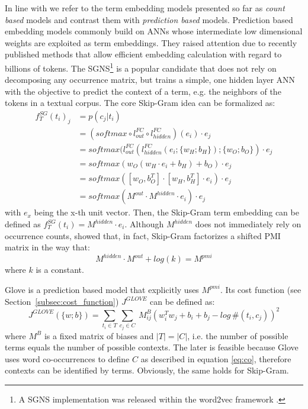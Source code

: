 In line with \textcite{levy_improving_2015} we refer to the term embedding models presented so far as \textit{count based} models and contrast them with \textit{prediction based} models. Prediction based embedding models commonly build on \ac{ANN}s whose intermediate low %
dimensional weights are exploited as term embeddings. They raised attention due to recently published methods that allow efficient embedding calculation with regard to billions of tokens. The \ac{SGNS}\footnote{A \ac{SGNS} implementation was released within the word2vec framework \autocite{mikolov_efficient_2013}.} \autocite{mikolov_distributed_2013} is a popular candidate that does not rely on decomposing any occurrence matrix, but trains a simple, one hidden layer \acs{ANN} with the objective to predict the context of a term, e.g. the neighbors of the tokens in a textual corpus. The core Skip-Gram idea can be formalized as:
\begin{equation} \label{eq:sg}
\begin{split}
f^{SG}_T(t_i)_j & = p(c_j|t_i) \\
  & = (softmax \circ l^{FC}_{out} \circ l^{FC}_{hidden})(e_i) \cdot e_j \\
  & = softmax(l^{FC}_{out}(l^{FC}_{hidden}(e_i; \{w_{H};b_{H}\}); \{w_{O};b_{O}\}) \cdot e_j \\
  & = softmax(w_{O}(w_{H} \cdot e_i + b_{H}) + b_{O}) \cdot e_j \\
  & = softmax([w_{O},b^T_{O}] \cdot [w_{H},b^T_{H}]\cdot e_i) 
  \cdot e_j \\
  & = softmax(M^{out} \cdot M^{hidden} \cdot e_i) \cdot e_j
\end{split}
\end{equation}
with $e_x$ being the x-th unit vector.
Then, the Skip-Gram term embedding can be defined as $f_T^{SG}(t_i) = M^{hidden} \cdot e_i$. Although $M^{hidden}$ does not immediately rely on occurrence counts, \textcite{levy_neural_2014} showed that, in fact, Skip-Gram factorizes a shifted \ac{PMI} matrix in the way that: 
\begin{equation}
M^{hidden} \cdot M^{out} + log(k) = M^{pmi}
\end{equation}
where $k$ is a constant. 

Glove \autocite{pennington_glove_2014} is a prediction based model that explicitly uses $M^{pmi}$. Its cost function (see Section~\ref{subsec:cost_function}) $J^{GLOVE}$ can be defined as:
\begin{equation}
J^{GLOVE}(\{w; b\}) = \sum\limits_{t_i \in T}\sum\limits_{c_j \in C}\ M^{B}_{ij}(w_i^Tw_j + b_i + b_j - log\,\#(t_i,c_j))^2
\end{equation}
where $M^B$ is a fixed matrix of biases and $|T| = |C|$, i.e. the number of possible terms equals the number of possible contexts. The later is feasible because Glove uses word co-occurrences to define $C$ as described in equation \eqref{eq:co}, therefore contexts can be identified by terms. Obviously, the same holds for Skip-Gram.

